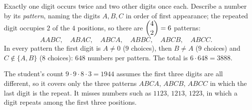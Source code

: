 Exactly one digit occurs twice and two other digits once each. Describe a number by its \emph{pattern}, naming the digits $A,B,C$ in order of first appearance; the repeated digit occupies $2$ of the $4$ positions, so there are $\dbinom42=6$ patterns:
\[
AABC,\quad ABAC,\quad ABCA,\quad ABBC,\quad ABCB,\quad ABCC .
\]
In every pattern the first digit is $A\ne0$ ($9$ choices), then $B\ne A$ ($9$ choices) and $C\notin\{A,B\}$ ($8$ choices): $648$ numbers per pattern. The total is $6\cdot648=\boxed{3888}$.

The student's count $9\cdot9\cdot8\cdot3=1944$ assumes the first three digits are all different, so it covers only the three patterns $ABCA$, $ABCB$, $ABCC$ in which the last digit is the repeat. It misses numbers such as $1123$, $1213$, $1223$, in which a digit repeats among the first three positions.
